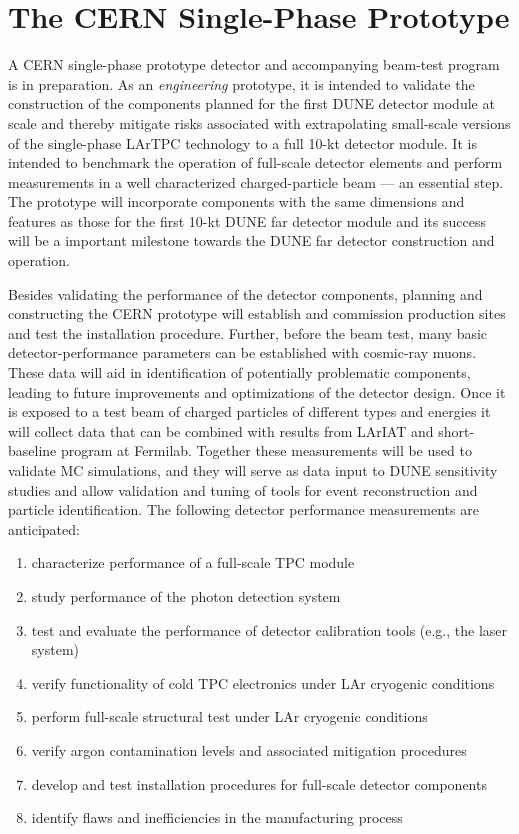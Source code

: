 \section{The CERN Single-Phase Prototype}
\label{sec:proto-cern-single}

A CERN single-phase prototype detector and accompanying beam-test
program is in preparation. As an \textit{engineering} prototype, it is
intended to validate the construction of the components planned for the
first DUNE  detector module at scale and thereby mitigate
risks associated with extrapolating small-scale versions of the
single-phase LArTPC technology to a full 10-kt detector module.  It is
intended to benchmark the operation of full-scale detector
elements and perform measurements in a well characterized
charged-particle beam --- an essential step.
%
The prototype will incorporate components with the same
dimensions and features as those for the first 10-kt DUNE far detector
module and its success will be a important milestone towards the DUNE
far detector construction and operation.

Besides validating the performance of the detector components,
planning and constructing the CERN prototype will establish and
commission production sites and test the installation procedure.
Further, before the beam test, many basic detector-performance
parameters can be established with cosmic-ray muons.  These data will
aid in identification of potentially problematic components, leading
to future improvements and optimizations of the detector design.
%
Once it is exposed to a test beam of charged particles of different
types and energies it will collect data that can be combined with
results from LArIAT and short-baseline program at Fermilab. Together
these measurements will be used to validate MC simulations, and they
will serve as data input to DUNE sensitivity studies and allow
validation and tuning of tools for event reconstruction and particle
identification.
The following detector performance measurements are anticipated:
 \begin{enumerate}
 \item characterize performance of a full-scale TPC module
 \item study performance of the photon detection system
 \item test and evaluate the performance of detector calibration tools (e.g., the laser system)
  \item verify functionality of cold TPC electronics under LAr cryogenic conditions
  \item perform full-scale structural test under LAr cryogenic conditions
  \item verify argon contamination levels and associated mitigation procedures
  \item develop and test installation procedures for full-scale detector components
  \item identify flaws and inefficiencies in the manufacturing process
\end{enumerate}


